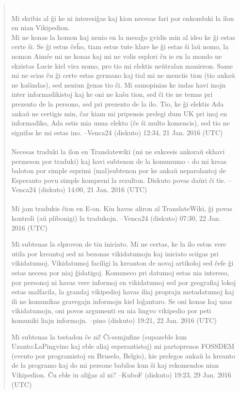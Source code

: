 \begin{quote}
\\
        Mi skribis al ĝi ke ni interesiĝas kaj kion necesas fari por enkonduki la ilon en nian Vikipedion. \\
        Mi ne konas la homon kaj nenio en la mesaĝo gvidis min al ideo ke ĝi estas certe ŝi. Se ĝi estus ĉeĥo, tiam estus tute klare ke ĝi estas ŝi laŭ nomo, la nomon Aimée mi ne konas kaj mi ne volis esplori ĉu ie en la mondo ne ekzistas Lucie kiel vira nomo, pro tio mi elektis neŭtralan manieron. Same mi ne scias ĉu ĝi certe estas germano kaj tial mi ne menciis tion (tio ankaŭ ne kaŝindas), sed neniun ĝenas tio ĉi. Mi samopinias ke indas havi inojn inter informadikistoj kaj ke oni ne kaŝu tion, sed ĉi tie ne temas pri prezento de la persono, sed pri prezento de la ilo. Tio, ke ĝi elektis Ada ankaŭ ne certigis min, ĉar kiam mi pripensis prelegi dum UK pri inoj en informadiko, Ada estis mia unua elekto (ĉe ŝi multo komencis), sed tio ne signifas ke mi estas ino. --Venca24 (diskuto) 12:34, 21 Jan. 2016 (UTC) \\
\\
            Necesas traduki la ilon en Translatewiki (mi ne sukcesis ankoraŭ ekhavi permeson por traduki) kaj havi subtenon de la komunumo - do mi kreas baloton por simple esprimi (mal)subtenon por ke ankaŭ neparolantoj de Esperanto povu simple kompreni la rezulton. Diskuto povas daŭri ĉi tie. --Venca24 (diskuto) 14:00, 21 Jan. 2016 (UTC) \\
\\
                Mi jam tradukis ĉion en E-on. Kiu havas aliron al TranslateWiki, ĝi povas kontroli (aŭ plibonigi) la tradukojn. --Venca24 (diskuto) 07:30, 22 Jan. 2016 (UTC)

                    Mi subtenas la elprovon de tiu iniciato. Mi ne certas, ke la ilo estus vere utila por kreantoj sed ni bezonas vikidatumojn kaj iniciato sciigas pri vikidatumoj. Vikidatumoj faciligi la kreanton de novaj artikoloj sed ĉefe ĝi estas necesa por niaj ĝidatigoj. Komuneco pri datumoj estas nia intereso, por personoj ni havas vere informoj en vikidatumoj sed por geografiaj lokoj estas malfacila, la grandaj vikipedioj havas iliaj proprajn metadatumoj kaj ili ne komunikas gravegajn informojn kiel loĝantaro. Se oni konas kaj uzas vikidatumojn, oni povos argumenti en nia lingvo vikipedio por peti komuniki liajn informojn. --pino (diskuto) 19:21, 22 Jan. 2016 (UTC)

Mi subtenas la testadon ĉe ni! Ĉi-semjnfine (supozeble kun Uzanto:LaPingvino kaj eble aliaj esperantistoj) mi partoprenos FOSSDEM (evento por programistoj en Bruselo, Belgio), kie prelegos ankaŭ la kreanto de la programo kaj do mi persone babilos kun ŝi kaj rekomendos nian Vikipedion. Ĉu eble iu aliĝas al ni? --KuboF (diskuto) 19:23, 29 Jan. 2016 (UTC)


\end{quote}
